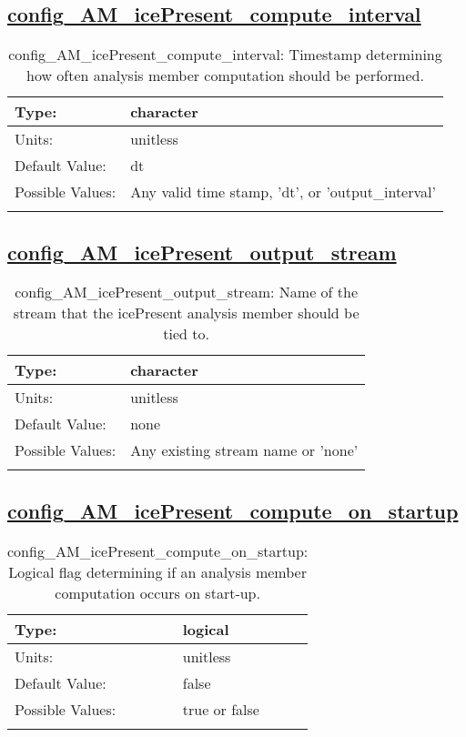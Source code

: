 \subsection[config\_AM\_icePresent\_compute\_interval]{\hyperref[sec:nm_tab_AM_icePresent]{config\_AM\_icePresent\_compute\_interval}}
\label{subsec:nm_sec_config_AM_icePresent_compute_interval}
\begin{center}
\begin{longtable}{| p{2.0in} || p{4.0in} |}
    \hline
    Type: & character \\
    \hline
    Units: & \si{unitless} \\
    \hline
    Default Value: & dt \\
    \hline
    Possible Values: & Any valid time stamp, 'dt', or 'output\_interval' \\
    \hline
    \caption{config\_AM\_icePresent\_compute\_interval: Timestamp determining how often analysis member computation should be performed.}
\end{longtable}
\end{center}
\subsection[config\_AM\_icePresent\_output\_stream]{\hyperref[sec:nm_tab_AM_icePresent]{config\_AM\_icePresent\_output\_stream}}
\label{subsec:nm_sec_config_AM_icePresent_output_stream}
\begin{center}
\begin{longtable}{| p{2.0in} || p{4.0in} |}
    \hline
    Type: & character \\
    \hline
    Units: & \si{unitless} \\
    \hline
    Default Value: & none \\
    \hline
    Possible Values: & Any existing stream name or 'none' \\
    \hline
    \caption{config\_AM\_icePresent\_output\_stream: Name of the stream that the icePresent analysis member should be tied to.}
\end{longtable}
\end{center}
\subsection[config\_AM\_icePresent\_compute\_on\_startup]{\hyperref[sec:nm_tab_AM_icePresent]{config\_AM\_icePresent\_compute\_on\_startup}}
\label{subsec:nm_sec_config_AM_icePresent_compute_on_startup}
\begin{center}
\begin{longtable}{| p{2.0in} || p{4.0in} |}
    \hline
    Type: & logical \\
    \hline
    Units: & \si{unitless} \\
    \hline
    Default Value: & false \\
    \hline
    Possible Values: & true or false \\
    \hline
    \caption{config\_AM\_icePresent\_compute\_on\_startup: Logical flag determining if an analysis member computation occurs on start-up.}
\end{longtable}
\end{center}
